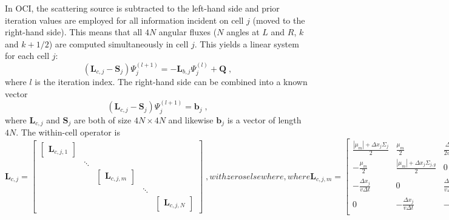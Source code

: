 In OCI, the scattering source is subtracted to the left-hand side and  prior iteration values are employed for all information incident on cell $j$ (moved to the right-hand side).
This means that all $4N$ angular fluxes ($N$ angles at $L$ and $R$, $k$ and $k+1/2$) are computed simultaneously in cell $j$.
This yields a linear system for each cell $j$:
\begin{equation}
    \label{eq:oci}
    \left( \bm{L}_{c,j} - \bm{S}_j \right) \Psi_j^{(l+1)} = -\textbf{L}_{b,j} \Psi_j^{(l)} + \textbf{Q} \;, 
\end{equation}
where $l$ is the iteration index.
The right-hand side can be combined into a known vector
\begin{equation}
     \left( \bm{L}_{c,j} - \bm{S}_j \right) \Psi_j^{(l+1)}  = \bm{b}_j \; ,
\end{equation}
where $\bm{L}_{c,j}$ and $\bm{S}_j$ are both of size $4N\times4N$ and likewise $\bm{b}_j$ is a vector of length $4N$.
\newcommand{\lcmj}[1]{\begin{bmatrix} \bm{L}_{c,j,#1} \end{bmatrix} }
\newcommand{\zeros}{\begin{bmatrix} 0 \end{bmatrix} }
The within-cell operator is
\begin{subequations}
\begin{equation}
    \label{eq:Aja}
    \bm{L}_{c,j} = \begin{bmatrix}
        \lcmj{1} &  &  &  &  \\
          & \ddots  &  &  & \\
          &  & \lcmj{m} &  & \\
          &  &  & \ddots &  \\
          &  &  &  & \lcmj{N}
    \end{bmatrix} \;,
\end{equation}
with zeros elsewhere, where
\begin{equation} \bm{L}_{c,j,m} =
    \label{eq:Aj}
    \begin{bmatrix}
    \frac{|\mu_m| + \Delta x_j \Sigma_{j} }{2}  & \frac{\mu_m}{2} & \frac{\Delta x_j}{2 v \Delta t} & 0 \\
    - \frac{\mu_m}{2} & \frac{|\mu_m| +  \Delta x_j \Sigma_{j,g} }{2} & 0 & \frac{\Delta x_j}{2 v \Delta t} \\
    -\frac{\Delta x_j}{v \Delta t}  & 0 & \frac{\Delta x_j}{v \Delta t} + \frac{|\mu_m| + \Delta x_j \Sigma_{j,g} }{2}  & \frac{\mu_m}{2}  \\
    0 &  -\frac{\Delta x_j}{v \Delta t}  &  - \frac{\mu_m}{2} & \frac{\Delta x_j}{v \Delta t}+ \frac{|\mu_m| + \Delta x_j \Sigma_{j,g}}{2}  \\
    \end{bmatrix} \; .
\end{equation}
\end{subequations}
